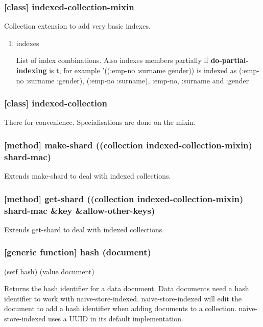 \documentclass[11pt]{article}
\begin{document}
\subsubsection{[class] indexed-collection-mixin}
\label{sec:org8337f66}

Collection extension to add very basic indexes.

\begin{enumerate}
\item\relax [accessor] indexes
\label{sec:org971ca52}

List of index combinations. Also indexes members partially if
\textbf{do-partial-indexing} is t, for example '((:emp-no :surname gender))
is indexed as (:emp-no :surname :gender), (:emp-no :surname), :emp-no,
:surname and :gender
\end{enumerate}

\subsubsection{[class] indexed-collection}
\label{sec:orgcf19d06}

There for convenience. Specialisations are done on the mixin.

\subsubsection{[method] make-shard ((collection indexed-collection-mixin) shard-mac)}
\label{sec:org5ba78e5}

Extends make-shard to deal with indexed collections.

\subsubsection{[method] get-shard ((collection indexed-collection-mixin) shard-mac \&key \&allow-other-keys)}
\label{sec:org9233dfd}

Extends get-shard to deal with indexed collections.

\subsubsection{[generic function] hash (document)}
\label{sec:org2a8463a}

(setf hash) (value document)

Returns the hash identifier for a data document. Data documents need a
hash identifier to work with naive-store-indexed. naive-store-indexed
will edit the document to add a hash identifier when adding documents
to a collection. naive-store-indexed uses a UUID in its default
implementation.
\end{document}
